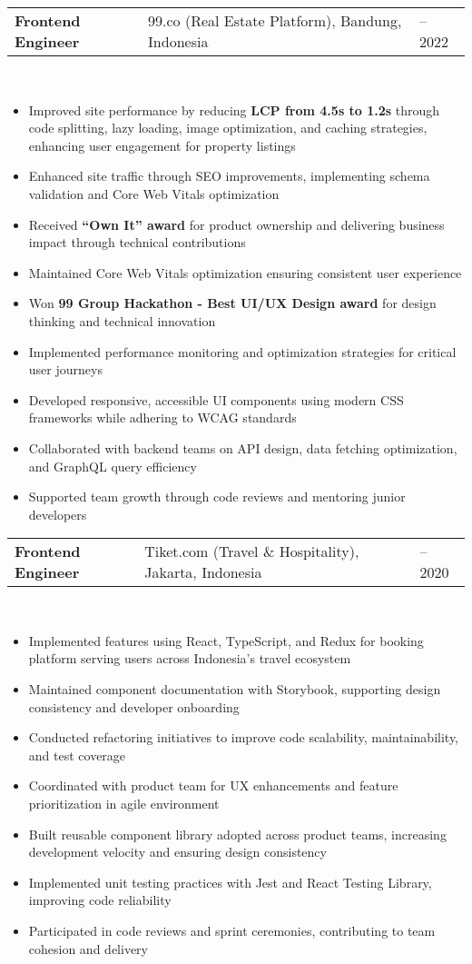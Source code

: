\documentclass[a4paper, 11pt]{article}
\newcommand{\resumeItem}[1]{
  \item\small{
    {#1 \vspace{-2pt}}
  }
}
\newcommand{\resumeSubheading}[4]{
  \vspace{-2pt}\item
    \begin{tabularx}{0.987\textwidth}[t]{
  >{\raggedright\arraybackslash}X
  >{\centering\arraybackslash}X
  >{\raggedleft\arraybackslash}X }
      \textbf{#1} & #2 & #3 \\
    \end{tabularx}
    \textit{\small#4}\\
    \vspace{-7pt}
}
\newcommand{\resumeItemListStart}{\begin{itemize}[leftmargin=0.22in]}
\newcommand{\resumeItemListEnd}{\end{itemize}\vspace{-20pt}}
\begin{document}
        \resumeSubheading
            {Frontend Engineer}{99.co (Real Estate Platform), Bandung, Indonesia}{2020 -- 2022}{}
            \resumeItemListStart
                \resumeItem{Improved site performance by reducing \textbf{LCP from 4.5s to 1.2s} through code splitting, lazy loading, image optimization, and caching strategies, enhancing user engagement for property listings}
                \resumeItem{Enhanced site traffic through SEO improvements, implementing schema validation and Core Web Vitals optimization}
                \resumeItem{Received \textbf{``Own It'' award} for product ownership and delivering business impact through technical contributions}
                \resumeItem{Maintained Core Web Vitals optimization ensuring consistent user experience}
                \resumeItem{Won \textbf{99 Group Hackathon - Best UI/UX Design award} for design thinking and technical innovation}
                \resumeItem{Implemented performance monitoring and optimization strategies for critical user journeys}
                \resumeItem{Developed responsive, accessible UI components using modern CSS frameworks while adhering to WCAG standards}
                \resumeItem{Collaborated with backend teams on API design, data fetching optimization, and GraphQL query efficiency}
                \resumeItem{Supported team growth through code reviews and mentoring junior developers}
            \resumeItemListEnd

        \resumeSubheading
            {Frontend Engineer}{Tiket.com (Travel \& Hospitality), Jakarta, Indonesia}{2019 -- 2020}{}
            \resumeItemListStart
                \resumeItem{Implemented features using React, TypeScript, and Redux for booking platform serving users across Indonesia's travel ecosystem}
                \resumeItem{Maintained component documentation with Storybook, supporting design consistency and developer onboarding}
                \resumeItem{Conducted refactoring initiatives to improve code scalability, maintainability, and test coverage}
                \resumeItem{Coordinated with product team for UX enhancements and feature prioritization in agile environment}
                \resumeItem{Built reusable component library adopted across product teams, increasing development velocity and ensuring design consistency}
                \resumeItem{Implemented unit testing practices with Jest and React Testing Library, improving code reliability}
                \resumeItem{Participated in code reviews and sprint ceremonies, contributing to team cohesion and delivery}
            \resumeItemListEnd
\end{document}

